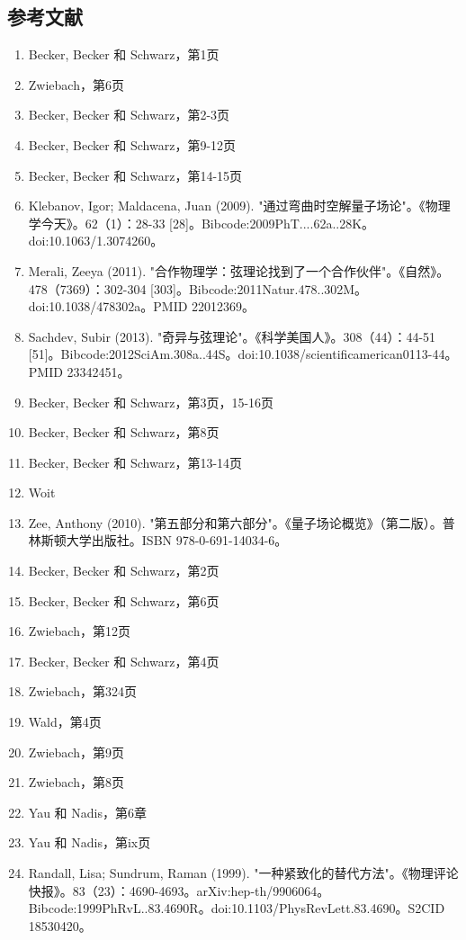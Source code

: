 \subsection{参考文献}  
\begin{enumerate}
\item Becker, Becker 和 Schwarz，第1页  
\item Zwiebach，第6页  
\item Becker, Becker 和 Schwarz，第2-3页  
\item Becker, Becker 和 Schwarz，第9-12页  
\item Becker, Becker 和 Schwarz，第14-15页  
\item Klebanov, Igor; Maldacena, Juan (2009). "通过弯曲时空解量子场论"。《物理学今天》。62（1）：28-33 [28]。Bibcode:2009PhT....62a..28K。doi:10.1063/1.3074260。  
\item Merali, Zeeya (2011). "合作物理学：弦理论找到了一个合作伙伴"。《自然》。478（7369）：302-304 [303]。Bibcode:2011Natur.478..302M。doi:10.1038/478302a。PMID 22012369。  
\item Sachdev, Subir (2013). "奇异与弦理论"。《科学美国人》。308（44）：44-51 [51]。Bibcode:2012SciAm.308a..44S。doi:10.1038/scientificamerican0113-44。PMID 23342451。  
\item Becker, Becker 和 Schwarz，第3页，15-16页  
\item Becker, Becker 和 Schwarz，第8页
\item Becker, Becker 和 Schwarz，第13-14页  
\item Woit  
\item Zee, Anthony (2010). "第五部分和第六部分"。《量子场论概览》（第二版）。普林斯顿大学出版社。ISBN 978-0-691-14034-6。  
\item Becker, Becker 和 Schwarz，第2页  
\item Becker, Becker 和 Schwarz，第6页  
\item Zwiebach，第12页  
\item Becker, Becker 和 Schwarz，第4页  
\item Zwiebach，第324页  
\item Wald，第4页  
\item Zwiebach，第9页  
\item Zwiebach，第8页  
\item Yau 和 Nadis，第6章  
\item Yau 和 Nadis，第ix页  
\item Randall, Lisa; Sundrum, Raman (1999). "一种紧致化的替代方法"。《物理评论快报》。83（23）：4690-4693。arXiv:hep-th/9906064。Bibcode:1999PhRvL..83.4690R。doi:10.1103/PhysRevLett.83.4690。S2CID 18530420。

\end{enumerate}
